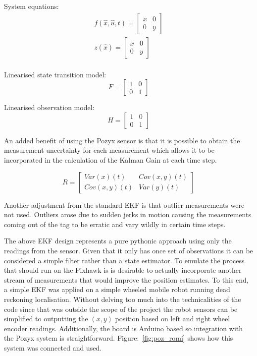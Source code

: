 System equations:
\begin{equation*}
    \begin{split}
        f(\hat{x},\hat{u},t) = \left[ \begin{array}{cc}
                              x & 0\\
                              0 & y
        \end{array} \right]\\
        z(\hat{x}) = \left[ \begin{array}{cc}
                              x & 0\\
                              0 & y
        \end{array} \right]\\
    \end{split}
\end{equation*}


Linearised state transition model:
\[
    F =
    \left[ \begin{array}{cc}
    1 & 0\\
    0 & 1
    \end{array}
    \right]
\]

Linearised observation model:
\[
    H =
    \left[ \begin{array}{cc}
    1 & 0\\
    0 & 1
    \end{array}
    \right]
\]

An added benefit of using the Pozyx sensor is that it is possible to obtain the measurement uncertainty for each measurement which allows it to be incorporated in the calculation of the Kalman Gain at each time step.

\[
    R =
%
        \left[
            \begin{array}{cc}
                Var(x)(t) & Cov(x,y)(t)\\
                Cov(x,y)(t) & Var(y)(t)
            \end{array}
        \right]
\]

Another adjustment from the standard EKF is that outlier measurements were not used.
Outliers arose due to sudden jerks in motion causing the measurements coming out of the tag to be erratic and vary wildly in certain time steps.

The above EKF design represents a pure pythonic approach using only the readings from the sensor.
Given that it only has once set of observations it can be considered a simple filter rather than a state estimator.
To emulate the process that should run on the Pixhawk is is desirable to actually incorporate another stream of measurements that would improve the position estimates.
To this end, a simple EKF was applied on a simple wheeled mobile robot running dead reckoning localisation.
Without delving too much into the technicalities of the code since that was outside the scope of the project the robot sensors can be simplified to outputting the $(x,y)$ position based on left and right wheel encoder readings.
Additionally, the board is Arduino based so integration with the Pozyx system is straightforward.
Figure:~\ref{fig:poz_romi} shows how this system was connected and used.

